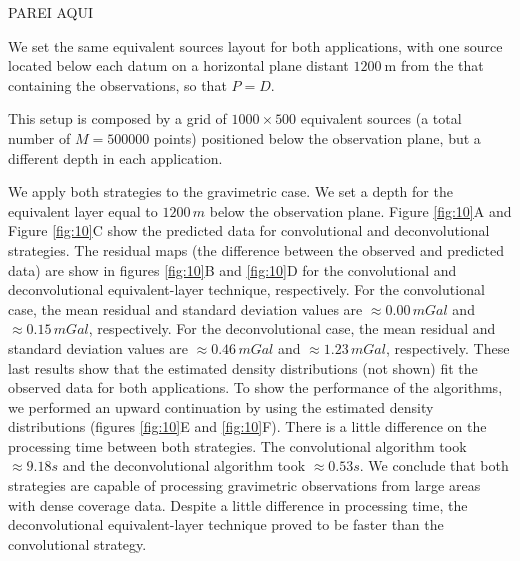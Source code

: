 PAREI AQUI

We set the same equivalent sources layout for both applications, with one source located below each datum on a horizontal
plane distant $1200 \: \mathrm{m}$ from the that containing the observations, so that $P=D$.

This setup is composed by a grid of $1000 \times 500$ equivalent sources (a total number of $M = 500000$ points) 
positioned below the observation plane, but a different depth in each application.

We apply both strategies to the gravimetric case. We set a depth for the equivalent layer equal to $1200 \, m$ below the observation plane. 
Figure \ref{fig:10}A and Figure \ref{fig:10}C show the predicted data for convolutional and deconvolutional strategies. 
The residual maps (the difference between the observed and predicted data) are show in figures \ref{fig:10}B and \ref{fig:10}D 
for the convolutional and deconvolutional equivalent-layer technique, respectively. For the convolutional case, the mean 
residual and standard deviation values are $\approx 0.00 \, mGal$ and $\approx 0.15 \, mGal$, respectively. 
For the deconvolutional case, the mean residual and standard deviation values are $\approx 0.46 \, mGal$ and $\approx 1.23 \, mGal$, respectively. 
These last results show that the estimated density distributions (not shown) fit the observed data for both applications. 
To show the performance of the algorithms, we performed an upward continuation by using the estimated density distributions 
(figures \ref{fig:10}E and \ref{fig:10}F). There is a little difference on the processing time between both strategies. 
The convolutional algorithm took $\approx 9.18 s$ and the deconvolutional algorithm took $\approx 0.53 s$. 
We conclude that both strategies are capable of processing gravimetric observations from large areas with dense coverage data. 
Despite a little difference in processing time, the deconvolutional equivalent-layer technique proved to be faster than the convolutional strategy.

